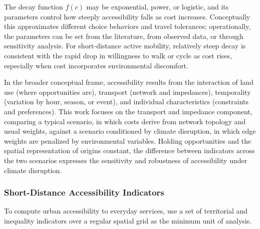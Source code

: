The decay function $f(c)$ may be exponential, power, or logistic, and its parameters control how steeply accessibility falls as cost increases. Conceptually this approximates different choice behaviors and travel tolerances; operationally, the parameters can be set from the literature, from observed data, or through sensitivity analysis. For short-distance active mobility, relatively steep decay is consistent with the rapid drop in willingness to walk or cycle as cost rises, especially when cost incorporates environmental discomfort.

In the broader conceptual frame, accessibility results from the interaction of land use (where opportunities are), transport (network and impedances), temporality (variation by hour, season, or event), and individual characteristics (constraints and preferences). This work focuses on the transport and impedance component, comparing a typical scenario, in which costs derive from network topology and usual weights, against a scenario conditioned by climate disruption, in which edge weights are penalized by environmental variables. Holding opportunities and the spatial representation of origins constant, the difference between indicators across the two scenarios expresses the sensitivity and robustness of accessibility under climate disruption.

\subsubsection{Short-Distance Accessibility Indicators}
\label{subsubsec:indicadores}

To compute urban accessibility to everyday services, \cite{Bruno2024} use a set of territorial and inequality indicators over a regular spatial grid as the minimum unit of analysis.


